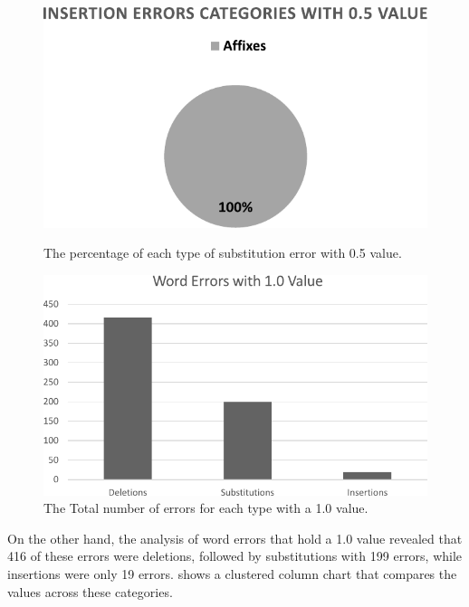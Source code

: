 \documentclass[english]{textolivre}
\begin{document}
\begin{figure}[h]
\begin{minipage}[t]{0.47\textwidth}
\includegraphics[width=\linewidth]{Figure7.pdf}
\caption{The percentage of each type of substitution error with 0.5 value.}\label{fig:fig7}
\end{minipage}
\hfill
\begin{minipage}[t]{0.47\textwidth}
\includegraphics[width=\linewidth]{Figure8.pdf}
\caption{The Total number of errors for each type with a 1.0 value.}\label{fig:fig8}
\end{minipage}
\end{figure}


On the other hand, the analysis of word errors that hold a 1.0 value
revealed that 416 of these errors were deletions, followed by
substitutions with 199 errors, while insertions were only 19 errors.
 shows a clustered column chart that compares the values across
these categories.

\end{document}
